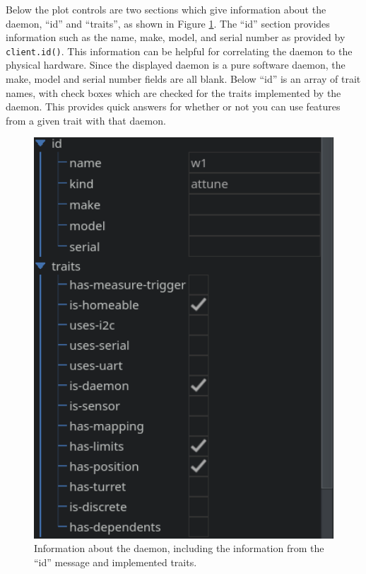 Below the plot controls are two sections which give information about the daemon, ``id'' and ``traits'', as shown in Figure \ref{yaq:fig:has_position_info}.
The ``id'' section provides information such as the name, make, model, and serial number as provided by \texttt{client.id()}.
This information can be helpful for correlating the daemon to the physical hardware.
Since the displayed daemon is a pure software daemon, the make, model and serial number fields are all blank.
Below ``id'' is an array of trait names, with check boxes which are checked for the traits implemented by the daemon.
This provides quick answers for whether or not you can use features from a given trait with that daemon.

\begin{figure}
\includegraphics[width=4.5in]{"yaq/images/has_position_info"}
\caption[\yaqcqtpy{} has-position Information]{
	Information about the daemon, including the information from the ``id'' message and implemented traits.
}
\label{yaq:fig:has_position_info}
\end{figure}

